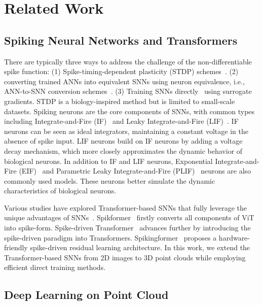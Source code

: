 \section{Related Work}
\subsection{Spiking Neural Networks and Transformers}


There are typically three ways to address the challenge of the non-differentiable spike function: (1) Spike-timing-dependent plasticity (STDP) schemes~\cite{bi1998synaptic}. (2) converting trained ANNs into equivalent SNNs using neuron equivalence, i.e., ANN-to-SNN conversion schemes~\cite{hu2023fast,wang2023masked}. (3) Training SNNs directly~\cite{guo2023rmp} using surrogate gradients. STDP is a biology-inspired method but is limited to small-scale datasets. 
Spiking neurons are the core components of SNNs, with common types including Integrate-and-Fire (IF)~\cite{bulsara1996cooperative} and Leaky Integrate-and-Fire (LIF)~\cite{gerstner2002spiking}. IF neurons can be seen as ideal integrators, maintaining a constant voltage in the absence of spike input. LIF neurons build on IF neurons by adding a voltage decay mechanism, which more closely approximates the dynamic behavior of biological neurons. In addition to IF and LIF neurons, Exponential Integrate-and-Fire (EIF)~\cite{brette2005adaptive} and Parametric Leaky Integrate-and-Fire (PLIF)~\cite{fang2021incorporating} neurons are also commonly used models. These neurons better simulate the dynamic characteristics of biological neurons. 

Various studies have explored Transformer-based SNNs that fully leverage the unique advantages of SNNs~\cite{kai2024evtexture}. Spikformer~\cite{zhouspikformer} firstly converts all components of ViT~\cite{dosovitskiy2020image} into spike-form. Spike-driven Transformer~\cite{yao2024spike} advances further by introducing the spike-driven paradigm into Transformers. Spikingformer~\cite{zhou2023spikingformer} proposes a hardware-friendly spike-driven residual learning architecture. In this work, we extend the Transformer-based SNNs from 2D images to 3D point clouds while employing efficient direct training methods.

\subsection{Deep Learning on Point Cloud}


